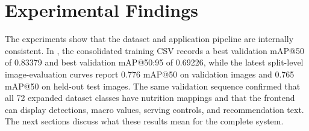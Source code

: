 \section{Experimental Findings}

The experiments show that the dataset and application pipeline are internally consistent. In , the consolidated training CSV records a best validation mAP@50 of 0.83379 and best validation mAP@50:95 of 0.69226, while the latest split-level image-evaluation curves report 0.776 mAP@50 on validation images and 0.765 mAP@50 on held-out test images. The same validation sequence confirmed that all 72 expanded dataset classes have nutrition mappings and that the frontend can display detections, macro values, serving controls, and recommendation text. The next sections discuss what these results mean for the complete system.



